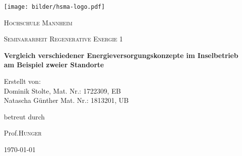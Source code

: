 \begin{titlepage}

  \texttt{[image: bilder/hsma-logo.pdf]}\par\vspace{1cm}
  \centering
	{\scshape\LARGE Hochschule Mannheim \par}
	\vspace{1cm}
	{\scshape\Large Seminararbeit Regenerative Energie 1\par}
	\vspace{1.5cm}
	{\huge\bfseries Vergleich verschiedener Energieversorgungskonzepte im Inselbetrieb am Beispiel zweier Standorte\par}
	\vspace{2cm}
	{\Large Erstellt von:\\Dominik Stolte, Mat. Nr.: 1722309, EB\\ Natascha Günther Mat. Nr.: 1813201, UB\par}
	\vfill
	betreut durch\par
	Prof.\textsc{Hunger}
	\vfill
	{\large \today\par}
\end{titlepage}
